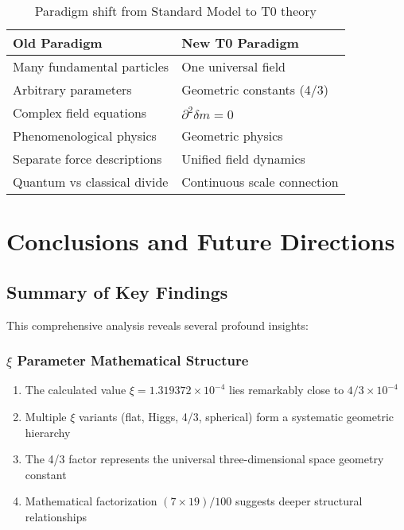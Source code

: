 \documentclass[12pt,a4paper]{article}
\newcommand{\xipar}{\ensuremath{\xi}}
\newcommand{\deltafield}{\ensuremath{\delta m}}
\newcommand{\mytimes}{\ensuremath{\times}}
\begin{document}
	\begin{table}[htbp]
		\centering
		\begin{tabular}{ll}
			\toprule
			\textbf{Old Paradigm} & \textbf{New T0 Paradigm} \\
			\midrule
			Many fundamental particles & One universal field \\
			Arbitrary parameters & Geometric constants (4/3) \\
			Complex field equations & $\partial^2\deltafield = 0$ \\
			Phenomenological physics & Geometric physics \\
			Separate force descriptions & Unified field dynamics \\
			Quantum vs classical divide & Continuous scale connection \\
			\bottomrule
		\end{tabular}
		\caption{Paradigm shift from Standard Model to T0 theory}
		\label{tab:paradigm_shift}
	\end{table}
	
	\section{Conclusions and Future Directions}
	\label{sec:conclusions}
	
	\subsection{Summary of Key Findings}
	\label{subsec:key_findings}
	
	This comprehensive analysis reveals several profound insights:
	
	\subsubsection{$\xi$ Parameter Mathematical Structure}
	\label{subsubsec:xi_mathematical_summary}
	
	\begin{enumerate}
		\item The calculated value $\xipar = 1.319372 \mytimes 10^{-4}$ lies remarkably close to $4/3 \mytimes 10^{-4}$
		\item Multiple $\xi$ variants (flat, Higgs, 4/3, spherical) form a systematic geometric hierarchy
		\item The 4/3 factor represents the universal three-dimensional space geometry constant
		\item Mathematical factorization $(7 \mytimes 19)/100$ suggests deeper structural relationships
	\end{enumerate}
	
\end{document}
